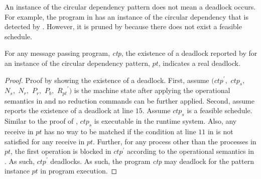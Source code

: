 \examplefigfour

An instance of the circular dependency pattern does not mean a deadlock occurs. For example, the program in  has an instance of the circular dependency that is detected by . However, it is pruned by  because there does not exist a feasible schedule.


\begin{lemma}
For any message passing program, \textit{ctp}, the existence of a deadlock reported by  for an instance of the circular dependency pattern, $\mathit{pt}$, indicates a real deadlock. 
\label{lemma:circular}
\end{lemma}
\begin{proof}
Proof by showing the existence of a deadlock. First, assume $(\mathit{ctp}^\prime,$ $\mathit{ctp}_s,$ $\mathit{N_s},$ $\mathit{N_r},$ $\mathit{P_r},$ $\mathit{P_b},$ $\mathit{R_{pt}}^\prime)$ is the machine state after applying the operational semantics in  and no reduction commands can be further applied. Second, assume  reports the existence of a deadlock at line $15$. Assume $\mathit{ctp}_s$ is a feasible schedule. Similar to the proof of , $\mathit{ctp}_s$ is executable in the runtime system. Also, any receive in $\mathit{pt}$ has no way to be matched if the condition at line $11$ in  is not satisfied for any receive in $\mathit{pt}$. Further, for any process other than the processes in $\mathit{pt}$, the first operation is blocked in $\mathit{ctp}^\prime$ according to the operational semantics in . As such, $\mathit{ctp}^\prime$ deadlocks. As such, the program \textit{ctp} may deadlock for the pattern instance $\mathit{pt}$ in program execution. 
\end{proof} 


